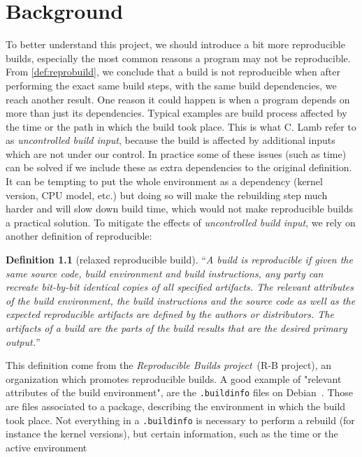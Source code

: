 \documentclass[a4paper,11pt,oneside]{report}
\theoremstyle{definition}
\newtheorem{definition}{Definition}[section]
\newcommand{\rb}{reproducible builds\xspace}
\begin{document}
\chapter{Background}
\label{chap:bg}

To better understand this project, we should introduce a bit more \rb,
especially the most common reasons a program may not be reproducible. From
\autoref{def:reprobuild}, we conclude that a build is not reproducible when
after performing the exact same build steps, with the same build dependencies,
we reach another result. One reason it could happen is when a program
depends on more than just its dependencies. Typical examples are build process
affected by the time or the path in which the build took place. This is what C.
Lamb refer to as \emph{uncontrolled build input}, because the build is
affected by additional inputs which are not under our control.
In practice some of these issues (such as time) can be solved if we
include these as extra dependencies to the original definition. It can be tempting
to put the whole environment as a dependency (kernel version, CPU model, etc.) but
doing so will make the rebuilding step much harder and will slow down build time,
which would not make \rb a practical solution.
To mitigate the effects of \emph{uncontrolled build input}, we rely on another
definition of reproducible:
\begin{definition}[relaxed reproducible build]
\label{def:reprobuild2}
``\emph{A build is reproducible if given the same source code, build
    environment and build instructions, any party can recreate bit-by-bit
    identical copies of all specified artifacts.
The relevant attributes of the build environment, the build instructions and
    the source code as well as the expected reproducible artifacts are defined
    by the authors or distributors. The artifacts of a build are the parts of
    the build results that are the desired primary output.}''~\cite{reprobuilds:def}
\end{definition}
This definition come from the \emph{Reproducible Builds project}~(R-B
project), an organization which promotes \rb. A good example of "relevant
attributes of the build environment", are the \verb|.buildinfo| files on
Debian~\cite{debian:buildinfo}. Those are files associated to a package,
describing the environment in which the build took place. Not everything in a
\verb|.buildinfo| is necessary to perform a rebuild (for instance the kernel
versions), but certain information, such as the time or the active environment
\end{document}
